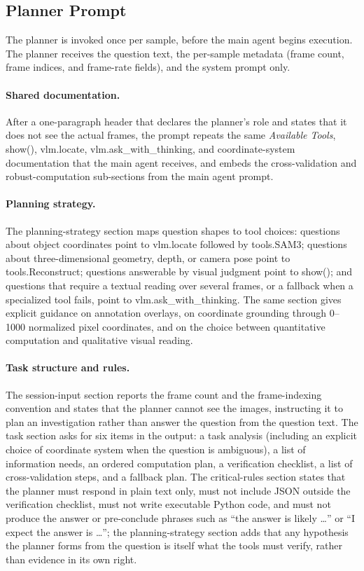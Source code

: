 \documentclass{llmxive}
\providecommand{\apicode}[1]{#1}
\begin{document}
\subsection{Planner Prompt}
\label{app:prompt_planner}
The planner is invoked once per sample, before the main agent begins execution. The planner receives the question text, the per-sample metadata (frame count, frame indices, and frame-rate fields), and the system prompt only.

\paragraph{Shared documentation.}
After a one-paragraph header that declares the planner's role and states that it does not see the actual frames, the prompt repeats the same \emph{Available Tools}, \apicode{show()}, \apicode{vlm.locate}, \apicode{vlm.ask_with_thinking}, and coordinate-system documentation that the main agent receives, and embeds the cross-validation and robust-computation sub-sections from the main agent prompt.

\paragraph{Planning strategy.}
The planning-strategy section maps question shapes to tool choices: questions about object coordinates point to \apicode{vlm.locate} followed by \apicode{tools.SAM3}; questions about three-dimensional geometry, depth, or camera pose point to \apicode{tools.Reconstruct}; questions answerable by visual judgment point to \apicode{show()}; and questions that require a textual reading over several frames, or a fallback when a specialized tool fails, point to \apicode{vlm.ask_with_thinking}. The same section gives explicit guidance on annotation overlays, on coordinate grounding through 0--1000 normalized pixel coordinates, and on the choice between quantitative computation and qualitative visual reading.

\paragraph{Task structure and rules.}
The session-input section reports the frame count and the frame-indexing convention and states that the planner cannot see the images, instructing it to plan an investigation rather than answer the question from the question text. The task section asks for six items in the output: a task analysis (including an explicit choice of coordinate system when the question is ambiguous), a list of information needs, an ordered computation plan, a verification checklist, a list of cross-validation steps, and a fallback plan. The critical-rules section states that the planner must respond in plain text only, must not include JSON outside the verification checklist, must not write executable Python code, and must not produce the answer or pre-conclude phrases such as ``the answer is likely \dots'' or ``I expect the answer is \dots''; the planning-strategy section adds that any hypothesis the planner forms from the question is itself what the tools must verify, rather than evidence in its own right.
\end{document}
